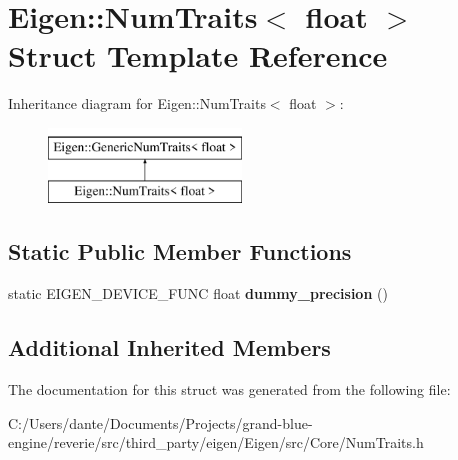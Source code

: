 \hypertarget{struct_eigen_1_1_num_traits_3_01float_01_4}{}\section{Eigen\+::Num\+Traits$<$ float $>$ Struct Template Reference}
\label{struct_eigen_1_1_num_traits_3_01float_01_4}
Inheritance diagram for Eigen\+::Num\+Traits$<$ float $>$\+:\begin{figure}[H]
\begin{center}
\leavevmode
\includegraphics[height=2.000000cm]{struct_eigen_1_1_num_traits_3_01float_01_4}
\end{center}
\end{figure}
\subsection*{Static Public Member Functions}
\begin{DoxyCompactItemize}
\item 
\mbox{\label{struct_eigen_1_1_num_traits_3_01float_01_4_a9257602903a4e9bd9f201cf9f9c098fe}} 
static E\+I\+G\+E\+N\+\_\+\+D\+E\+V\+I\+C\+E\+\_\+\+F\+U\+NC float {\bfseries dummy\+\_\+precision} ()
\end{DoxyCompactItemize}
\subsection*{Additional Inherited Members}


The documentation for this struct was generated from the following file\+:\begin{DoxyCompactItemize}
\item 
C\+:/\+Users/dante/\+Documents/\+Projects/grand-\/blue-\/engine/reverie/src/third\+\_\+party/eigen/\+Eigen/src/\+Core/Num\+Traits.\+h\end{DoxyCompactItemize}
